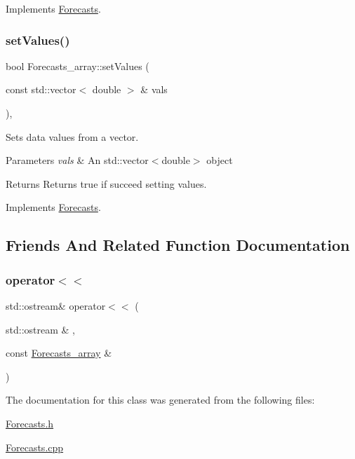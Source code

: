 Implements \mbox{\hyperlink{class_forecasts_ac3ba966466c340deaecf83fa239bef6d}{Forecasts}}.

\mbox{\label{class_forecasts__array_aba3f3632244ddb18c0b8a3fa0ee86981}} 
\subsubsection{\texorpdfstring{set\+Values()}{setValues()}}
{\footnotesize\ttfamily bool Forecasts\+\_\+array\+::set\+Values (\begin{DoxyParamCaption}\item[{const std\+::vector$<$ double $>$ \&}]{vals }\end{DoxyParamCaption})\hspace{0.3cm}{\ttfamily [override]}, {\ttfamily [virtual]}}

Sets data values from a vector.


\begin{DoxyParams}{Parameters}
{\em vals} & An std\+::vector$<$double$>$ object \\
\hline
\end{DoxyParams}
\begin{DoxyReturn}{Returns}
Returns true if succeed setting values. 
\end{DoxyReturn}


Implements \mbox{\hyperlink{class_forecasts_a2f249a4ec8571dcf2cfc23f06b942ad9}{Forecasts}}.



\subsection{Friends And Related Function Documentation}
\mbox{\label{class_forecasts__array_a6bde933a6e00ad1328f834e4f5d98606}} 
\subsubsection{\texorpdfstring{operator$<$$<$}{operator<<}}
{\footnotesize\ttfamily std\+::ostream\& operator$<$$<$ (\begin{DoxyParamCaption}\item[{std\+::ostream \&}]{,  }\item[{const \mbox{\hyperlink{class_forecasts__array}{Forecasts\+\_\+array}} \&}]{ }\end{DoxyParamCaption})\hspace{0.3cm}{\ttfamily [friend]}}



The documentation for this class was generated from the following files\+:\begin{DoxyCompactItemize}
\item 
\mbox{\hyperlink{_forecasts_8h}{Forecasts.\+h}}\item 
\mbox{\hyperlink{_forecasts_8cpp}{Forecasts.\+cpp}}\end{DoxyCompactItemize}
